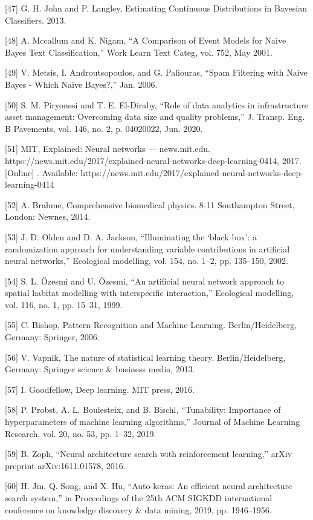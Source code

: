 \documentclass[sn-mathphys-num]{sn-jnl}%
\begin{document}
[47] G. H. John and P. Langley, Estimating Continuous Distributions in Bayesian Classifiers. 2013.

[48] A. Mccallum and K. Nigam, “A Comparison of Event Models for Naive Bayes Text Classification,” Work Learn Text Categ, vol. 752, May 2001.

[49] V. Metsis, I. Androutsopoulos, and G. Paliouras, “Spam Filtering with Naive Bayes - Which Naive Bayes?,” Jan. 2006.

[50] S. M. Piryonesi and T. E. El-Diraby, “Role of data analytics in infrastructure asset management: Overcoming data size and quality problems,” J. Transp. Eng. B Pavements, vol. 146, no. 2, p. 04020022, Jun. 2020.

[51] MIT, Explained: Neural networks — news.mit.edu. https://news.mit.edu/2017/explained-neural-networks-deep-learning-0414, 2017. [Online] . Available: https://news.mit.edu/2017/explained-neural-networks-deep-learning-0414

[52] A. Brahme, Comprehensive biomedical physics. 8-11 Southampton Street, London: Newnes, 2014.

[53] J. D. Olden and D. A. Jackson, “Illuminating the ‘black box’: a randomization approach for understanding variable contributions in artificial neural networks,” Ecological modelling, vol. 154, no. 1–2, pp. 135–150, 2002.

[54] S. L. Özesmi and U. Özesmi, “An artificial neural network approach to spatial habitat modelling with interspecific interaction,” Ecological modelling, vol. 116, no. 1, pp. 15–31, 1999.

[55] C. Bishop, Pattern Recognition and Machine Learning. Berlin/Heidelberg, Germany: Springer, 2006.

[56] V. Vapnik, The nature of statistical learning theory. Berlin/Heidelberg, Germany: Springer science & business media, 2013.

[57] I. Goodfellow, Deep learning. MIT press, 2016.

[58] P. Probst, A. L. Boulesteix, and B. Bischl, “Tunability: Importance of hyperparameters of machine learning algorithms,” Journal of Machine Learning Research, vol. 20, no. 53, pp. 1–32, 2019.

[59] B. Zoph, “Neural architecture search with reinforcement learning,” arXiv preprint arXiv:1611.01578, 2016.

[60] H. Jin, Q. Song, and X. Hu, “Auto-keras: An efficient neural architecture search system,” in Proceedings of the 25th ACM SIGKDD international conference on knowledge discovery & data mining, 2019, pp. 1946–1956.
\end{document}
